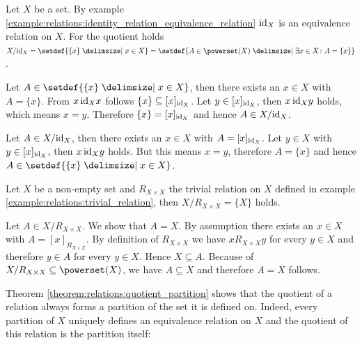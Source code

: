 \begin{examples}
    \begin{exampleenumerate}
        \item Let $X$ be a set. By example \ref{example:relations:identity_relation_equivalence_relation} $\text{id}_X$ is an equivalence relation on $X$. For the quotient holds $X/\idmap_X=\setdef{\{x\}\given x\in X}=\setdef{A\in \powerset(X)\given \exists x\in X\colon A=\{x\}}$.
        
        \begin{miniproof}
            \proofsubset Let $A\in\setdef{\{x\}\given x\in X}$, then there exists an $x\in X$ with $A=\{x\}$. From $x\,\text{id}_X x$ follows $\{x\}\subseteq [x]_{\text{id}_X}$. Let $y\in [x]_{\text{id}_X}$, then $x\,\text{id}_X y$ holds, which means $x=y$. Therefore $\{x\}=[x]_{\text{id}_X}$ and hence $A\in X/\text{id}_X$.

            \proofsupset Let $A\in X/\text{id}_X$, then there exists an $x\in X$ with $A=[x]_{\text{id}_X}$. Let $y\in X$ with $y\in[x]_{\text{id}_X}$, then $x\,\text{id}_X y$ holds. But this means $x=y$, therefore $A=\{x\}$ and hence $A\in\setdef{\{x\}\given x\in X}$.
        \end{miniproof}

        \item Let $X$ be a non-empty set and $R_{X\times X}$ the trivial relation on $X$ defined in example \ref{example:relations:trivial_relation}, then $X/R_{X\times X}=\{X\}$ holds.
        
        \begin{miniproof}
            Let $A\in X/R_{X\times X}$. We show that $A=X$. By assumption there exists an $x\in X$ with $A=[x]_{R_{X\times X}}$. By definition of $R_{X\times X}$ we have $x R_{X\times X} y$ for every $y\in X$ and therefore $y\in A$ for every $y\in X$. Hence $X\subseteq A$. Because of $X/R_{X\times X}\subseteq\powerset(X)$, we have $A\subseteq X$ and therefore $A=X$ follows.
        \end{miniproof}
    \end{exampleenumerate}
\end{examples}

Theorem \ref{theorem:relations:quotient_partition} shows that the quotient of a relation always forms a partition of the set it is defined on. Indeed, every partition of $X$ uniquely defines an equivalence relation on $X$ and the quotient of this relation is the partition itself:

